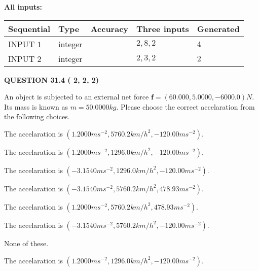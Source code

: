 \documentclass[12pt]{article}
\begin{document}
   
\noindent\vspace{0.1in}\hspace{-0.08in} {\textbf{\Large{All inputs: }}}
   
   
  
  
\noindent\begin{tabular}{|l|l|l|l|l|}
\hline
 Sequential & Type & Accuracy & Three inputs & Generated \\ 
\hline
 
 
  INPUT $           1$ & integer &  & $
 2
 , 
 8
 , 
 2
 $ & $ 4 $ 
 \\  \hline  
 
 
  INPUT $           2$ & integer &  & $
 2
 , 
 3
 , 
 2
 $ & $ 2 $ 
 \\  \hline  
 \end{tabular}
   
   
  
\vspace{0.2in}
  
{\textbf{\Large{QUESTION
31.4 
 (          2,          2,          2)
}}}
  
  
 
An object is subjected to an external net force $\mathbf{f}=(
60.000 ,
5.0000,
-6000.0  )N$. Its mass is known as
$m= %
50.0000  kg$. Please choose the correct accelaration
from the following choices.
 
 
 
The accelaration is
$(
1.2000ms^{-2},
5760.2km/h^2,
-120.00ms^{-2}
).
$
 
 
The accelaration is
$(
1.2000ms^{-2},
1296.0km/h^2,
-120.00ms^{-2}
).
$
 
 
The accelaration is
$(
-3.1540ms^{-2},
1296.0km/h^2,
-120.00ms^{-2}
).
$
 
 
The accelaration is
$(
-3.1540ms^{-2},
5760.2km/h^2,
478.93ms^{-2}
).
$
 
 
The accelaration is
$(
1.2000ms^{-2},
5760.2km/h^2,
478.93ms^{-2}
).
$
 
 
The accelaration is
$(
-3.1540ms^{-2},
5760.2km/h^2,
-120.00ms^{-2}
).
$
 
 
 None of these.
 
 
\noindent{}
 
 
The accelaration is
$(
1.2000ms^{-2},
1296.0km/h^2,
-120.00ms^{-2}
).
$
 
\end{document}
